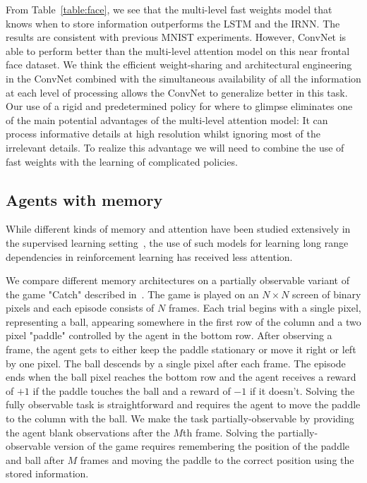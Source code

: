 \documentclass{article}
\begin{document}
From Table~\ref{table:face}, we see that the multi-level fast weights model that knows when to store information outperforms the LSTM and the IRNN.  The results are consistent with previous MNIST experiments. However, ConvNet is able to perform better than the multi-level attention model on this near frontal face dataset. We think the efficient weight-sharing and architectural engineering in the ConvNet combined with the simultaneous availability of all the information at each level of processing allows the ConvNet to generalize better in this task. Our use of a rigid and predetermined policy for where to glimpse eliminates one of the main potential advantages of the multi-level attention model: It can process informative details at high resolution whilst ignoring most of the irrelevant details.  To realize this advantage we will need to combine the use of fast weights with the learning of complicated policies.

\subsection{Agents with memory} \label{section:agents}

While different kinds of memory and attention have been studied extensively in the supervised learning setting~\citep{lstm-handwriting,recurrent-attention,neural-machine-translation}, the use of such models for learning long range dependencies in reinforcement learning has received less attention.


We compare different memory architectures on a partially observable variant of the game "Catch" described in~\citep{recurrent-attention}.
The game is played on an $N\times N$ screen of binary pixels and each episode consists of $N$ frames.
Each trial begins with a single pixel, representing a ball, appearing somewhere in the first row of the column and a two pixel "paddle" controlled by the agent in the bottom row.
After observing a frame, the agent gets to either keep the paddle stationary or move it right or left by one pixel.
The ball descends by a single pixel after each frame.
The episode ends when the ball pixel reaches the bottom row and the agent receives a reward of $+1$ if the paddle touches the ball and a reward of $-1$ if it doesn't.
Solving the fully observable task is straightforward and requires the agent to move the paddle to the column with the ball.
We make the task partially-observable by providing the agent blank observations after the $M$th frame.
Solving the partially-observable version of the game requires remembering the position of the paddle and ball after $M$ frames and moving the paddle to the correct position using the stored information.
\end{document}
